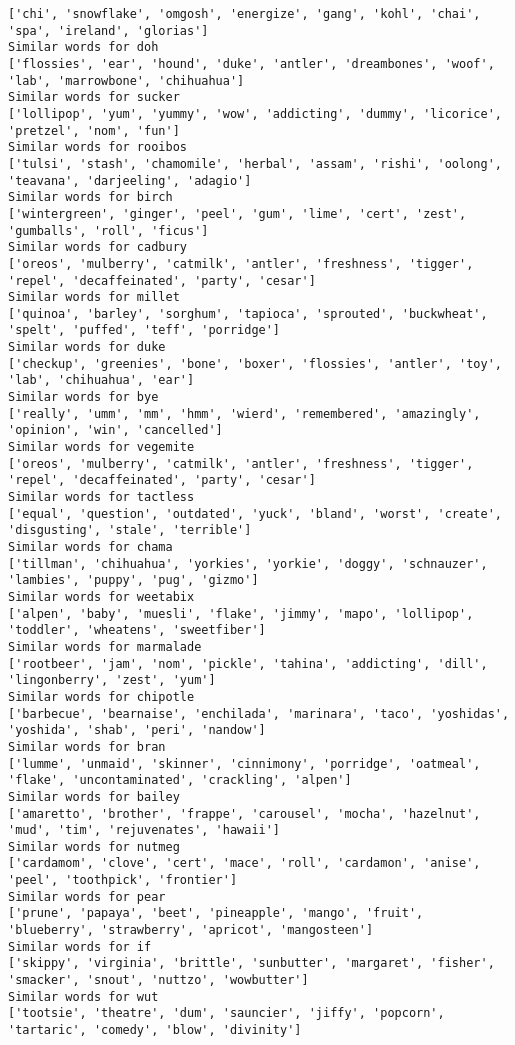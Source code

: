 \documentclass[11pt]{article}
\begin{document}
\begin{Verbatim}[commandchars=\\\{\}]
['chi', 'snowflake', 'omgosh', 'energize', 'gang', 'kohl', 'chai', 'spa', 'ireland', 'glorias']
Similar words for doh
['flossies', 'ear', 'hound', 'duke', 'antler', 'dreambones', 'woof', 'lab', 'marrowbone', 'chihuahua']
Similar words for sucker
['lollipop', 'yum', 'yummy', 'wow', 'addicting', 'dummy', 'licorice', 'pretzel', 'nom', 'fun']
Similar words for rooibos
['tulsi', 'stash', 'chamomile', 'herbal', 'assam', 'rishi', 'oolong', 'teavana', 'darjeeling', 'adagio']
Similar words for birch
['wintergreen', 'ginger', 'peel', 'gum', 'lime', 'cert', 'zest', 'gumballs', 'roll', 'ficus']
Similar words for cadbury
['oreos', 'mulberry', 'catmilk', 'antler', 'freshness', 'tigger', 'repel', 'decaffeinated', 'party', 'cesar']
Similar words for millet
['quinoa', 'barley', 'sorghum', 'tapioca', 'sprouted', 'buckwheat', 'spelt', 'puffed', 'teff', 'porridge']
Similar words for duke
['checkup', 'greenies', 'bone', 'boxer', 'flossies', 'antler', 'toy', 'lab', 'chihuahua', 'ear']
Similar words for bye
['really', 'umm', 'mm', 'hmm', 'wierd', 'remembered', 'amazingly', 'opinion', 'win', 'cancelled']
Similar words for vegemite
['oreos', 'mulberry', 'catmilk', 'antler', 'freshness', 'tigger', 'repel', 'decaffeinated', 'party', 'cesar']
Similar words for tactless
['equal', 'question', 'outdated', 'yuck', 'bland', 'worst', 'create', 'disgusting', 'stale', 'terrible']
Similar words for chama
['tillman', 'chihuahua', 'yorkies', 'yorkie', 'doggy', 'schnauzer', 'lambies', 'puppy', 'pug', 'gizmo']
Similar words for weetabix
['alpen', 'baby', 'muesli', 'flake', 'jimmy', 'mapo', 'lollipop', 'toddler', 'wheatens', 'sweetfiber']
Similar words for marmalade
['rootbeer', 'jam', 'nom', 'pickle', 'tahina', 'addicting', 'dill', 'lingonberry', 'zest', 'yum']
Similar words for chipotle
['barbecue', 'bearnaise', 'enchilada', 'marinara', 'taco', 'yoshidas', 'yoshida', 'shab', 'peri', 'nandow']
Similar words for bran
['lumme', 'unmaid', 'skinner', 'cinnimony', 'porridge', 'oatmeal', 'flake', 'uncontaminated', 'crackling', 'alpen']
Similar words for bailey
['amaretto', 'brother', 'frappe', 'carousel', 'mocha', 'hazelnut', 'mud', 'tim', 'rejuvenates', 'hawaii']
Similar words for nutmeg
['cardamom', 'clove', 'cert', 'mace', 'roll', 'cardamon', 'anise', 'peel', 'toothpick', 'frontier']
Similar words for pear
['prune', 'papaya', 'beet', 'pineapple', 'mango', 'fruit', 'blueberry', 'strawberry', 'apricot', 'mangosteen']
Similar words for if
['skippy', 'virginia', 'brittle', 'sunbutter', 'margaret', 'fisher', 'smacker', 'snout', 'nuttzo', 'wowbutter']
Similar words for wut
['tootsie', 'theatre', 'dum', 'sauncier', 'jiffy', 'popcorn', 'tartaric', 'comedy', 'blow', 'divinity']

\end{Verbatim}
\end{document}
